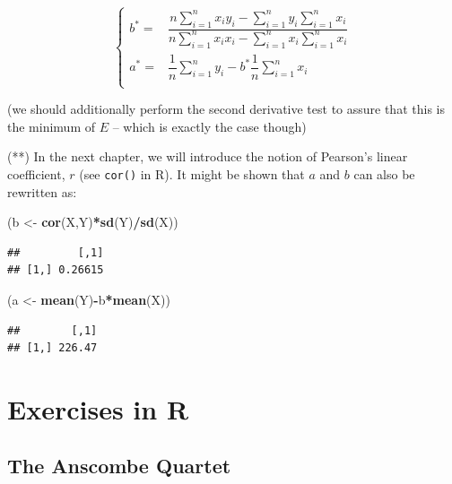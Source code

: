 \documentclass[10pt,b5paper,krantz1]{krantz}
\newenvironment{Shaded}{\begin{snugshade}}{\end{snugshade}}
\newcommand{\KeywordTok}[1]{\textcolor[rgb]{0.27,0.27,0.27}{\textbf{#1}}}
\newcommand{\NormalTok}[1]{#1}
\newcommand{\OperatorTok}[1]{\textcolor[rgb]{0.43,0.43,0.43}{\textbf{#1}}}
\newcommand{\StringTok}[1]{\textcolor[rgb]{0.5,0.5,0.5}{#1}}
\begin{document}
\[
\left\{
\begin{array}{rl}
b^*  = & \dfrac{
n \displaystyle\sum_{i=1}^n x_i y_i - \displaystyle\sum_{i=1}^n  y_i \displaystyle\sum_{i=1}^n x_i
}{
n \displaystyle\sum_{i=1}^n x_i x_i -   \displaystyle\sum_{i=1}^n x_i\displaystyle\sum_{i=1}^n x_i
}\\
a^* = & \dfrac{1}{n}\displaystyle\sum_{i=1}^n  y_i - b^*  \dfrac{1}{n} \displaystyle\sum_{i=1}^n x_i  \\
\end{array}
\right.
\]

(we should additionally perform the second derivative test
to assure that this is the minimum of \(E\) -- which is exactly the case though)

(**) In the next chapter, we will introduce the notion of Pearson's
linear coefficient, \(r\) (see \texttt{cor()} in R). It might be shown that
\(a\) and \(b\) can also be rewritten as:

\begin{Shaded}
\begin{Highlighting}[]
\NormalTok{(b <-}\StringTok{ }\KeywordTok{cor}\NormalTok{(X,Y)}\OperatorTok{*}\KeywordTok{sd}\NormalTok{(Y)}\OperatorTok{/}\KeywordTok{sd}\NormalTok{(X))}
\end{Highlighting}
\end{Shaded}

\begin{verbatim}
##         [,1]
## [1,] 0.26615
\end{verbatim}

\begin{Shaded}
\begin{Highlighting}[]
\NormalTok{(a <-}\StringTok{ }\KeywordTok{mean}\NormalTok{(Y)}\OperatorTok{-}\NormalTok{b}\OperatorTok{*}\KeywordTok{mean}\NormalTok{(X))}
\end{Highlighting}
\end{Shaded}

\begin{verbatim}
##        [,1]
## [1,] 226.47
\end{verbatim}

\hypertarget{exercises-in-r}{%
\section{Exercises in R}\label{exercises-in-r}}

\hypertarget{the-anscombe-quartet}{%
\subsection{The Anscombe Quartet}\label{the-anscombe-quartet}}
\end{document}

